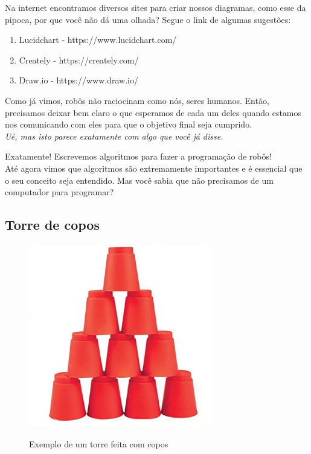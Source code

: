     Na internet encontramos diversos sites para criar nossos diagramas, como esse da pipoca, por que você não dá uma olhada? Segue o link de algumas sugestões: \par 
    
    \begin{enumerate}   
    \item Lucidchart  - https://www.lucidchart.com/
    \item Creately - https://creately.com/ 
    \item Draw.io - https://www.draw.io/ 
    \end{enumerate}   

    Como já vimos, robôs não raciocinam como nós, seres humanos. Então, precisamos deixar bem claro o que esperamos de cada um deles quando estamos nos comunicando com eles para que o objetivo final seja cumprido.\\
    
    \textit{Ué, mas isto parece exatamente com algo que você já disse.} \par
    Exatamente! Escrevemos algoritmos para fazer a programação de robôs!\\

    Até agora vimos que algoritmos são extremamente importantes e é essencial que o seu conceito seja entendido. Mas você sabia que não precisamos de um computador para programar? 
    
\subsection{Torre de copos}
    \begin{figure}[h]
    \caption{Exemplo de um torre feita com copos}
     
    \centering 
    \includegraphics[width=8cm]{Figuras/torre.jpg}
    \label{figura:torre.jpeg}
    \end{figure}

